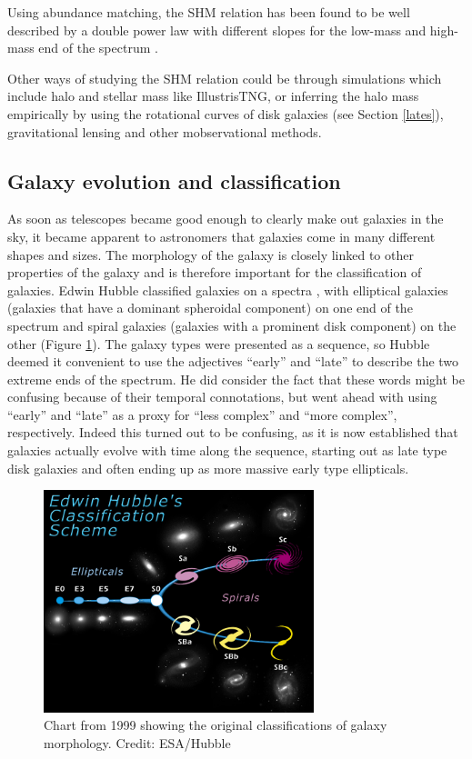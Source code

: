 Using abundance matching, the SHM relation has been found to be well described by a double power law with different slopes for the low-mass and high-mass end of the spectrum \parencite{Behroozi2013}. 

Other ways of studying the SHM relation could be through simulations which include halo and stellar mass like IllustrisTNG, or inferring the halo mass empirically by using the rotational curves of disk galaxies (see Section \ref{lates}), gravitational lensing and other mobservational methods.

\subsection{Galaxy evolution and classification}

As soon as telescopes became good enough to clearly make out galaxies in the sky, it became apparent to astronomers that galaxies come in many different shapes and sizes. The morphology of the galaxy is closely linked to other properties of the galaxy and is therefore important for the classification of galaxies. Edwin Hubble classified galaxies on a spectra \parencite{Hubble1926}, with elliptical galaxies (galaxies that have a dominant spheroidal component) on one end of the spectrum and spiral galaxies (galaxies with a prominent disk component) on the other (Figure \ref{hubble}). The galaxy types were presented as a sequence, so Hubble deemed it convenient to use the adjectives ``early'' and ``late'' to describe the two extreme ends of the spectrum. He did consider the fact that these words might be confusing because of their temporal connotations, but went ahead with using ``early'' and ``late'' as a proxy for ``less complex'' and ``more complex'', respectively. Indeed this turned out to be confusing, as it is now established that galaxies actually evolve with time along the sequence, starting out as late type disk galaxies and often ending up as more massive early type ellipticals.

\begin{figure}
    \centering
    \includegraphics[width=0.7\textwidth]{images/hubble.jpg}
    \caption{Chart from 1999 showing the original classifications of galaxy morphology. Credit: ESA/Hubble}
    \label{hubble}
\end{figure}

